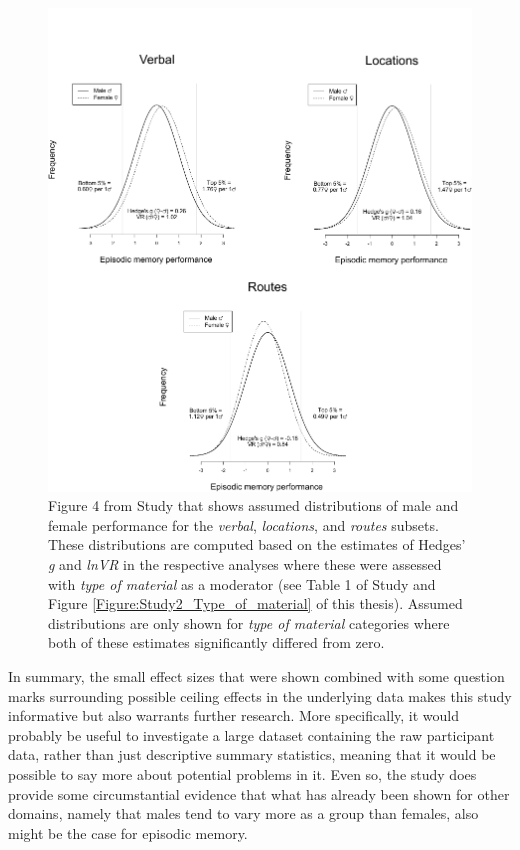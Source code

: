 \begin{figure} \centering \includegraphics[width=120mm]{./Figures/Study2_Assumed_distributions.pdf} \caption{Figure 4 from Study  that shows assumed distributions of male and female performance for the \emph{verbal}, \emph{locations}, and \emph{routes} subsets. These distributions are computed based on the estimates of Hedges' \emph{g} and \emph{lnVR} in the respective analyses where these were assessed with \emph{type of material} as a moderator (see Table 1 of Study  and Figure \ref{Figure:Study2_Type_of_material} of this thesis). Assumed distributions are only shown for \emph{type of material} categories where both of these estimates significantly differed from zero.} \label{Figure:Study2_Assumed_distributions} \end{figure}

In summary, the small effect sizes that were shown combined with some question marks surrounding possible ceiling effects in the underlying data makes this study informative but also warrants further research. More specifically, it would probably be useful to investigate a large dataset containing the raw participant data, rather than just descriptive summary statistics, meaning that it would be possible to say more about potential problems in it. Even so, the study does provide some circumstantial evidence that what has already been shown for other domains, namely that males tend to vary more as a group than females, also might be the case for episodic memory.


